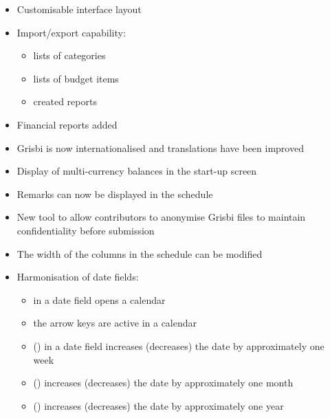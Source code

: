 \begin{itemize}
	\item Customisable interface layout%
	\item Import/export capability:%
		\begin{itemize}
			\item[\textopenbullet] lists of categories%
			\item[\textopenbullet] lists of budget items%
			\item[\textopenbullet] created reports%
		\end{itemize}	
	\item Financial reports added%
	\item Grisbi is now internationalised and translations have been improved%
	\item Display of multi-currency balances in the start-up screen%
	\item Remarks can now be displayed in the schedule%
	\item New tool to allow contributors to anonymise Grisbi files to maintain confidentiality before submission%
	\item The width of the columns in the schedule can be modified%
	\item Harmonisation of date fields:%
		\begin{itemize}
			\item[\textopenbullet]  in a date field opens a calendar%
			\item[\textopenbullet] the arrow keys are active in a calendar%
			\item[\textopenbullet]  () in a date field increases (decreases) the date by approximately one week%
			\item[\textopenbullet]  () increases (decreases) the date by approximately one month%
			\item[\textopenbullet]  () increases (decreases) the date by approximately one year%
		\end{itemize}	
\end{itemize}

